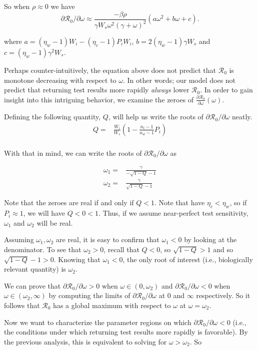 \documentclass[12pt]{article}
\newcommand{\Rnum}{\mathcal{R}_0}
\theoremstyle{definition} %
\begin{document}
So when $\rho \approx 0$ we have $$\partial{\Rnum}/\partial{\omega} \approx  \frac{-\beta \rho}{\gamma W_s\omega^2 (\gamma+\omega)^2}  (a \omega^2 + b \omega + c).$$

where $a=(\eta_w-1)W_i-(\eta_c-1)P_iW_i$, $b=2(\eta_w-1)\gamma W_s$ and $c=(\eta_w-1)\gamma^2 W_s$. 

Perhaps counter-intuitively, the equation above does not predict that $\Rnum$ is monotone decreasing with respect to $\omega$. In other words; our model does not predict that returning test results more rapidly \textit{always} lower $\Rnum$. In order to gain insight into this intriguing behavior, we examine the zeroes of $\frac{\partial{\Rnum}}{\partial{\omega}}(\omega)$.

Defining the following quantity, $Q$, will help us write the roots of $\partial{\Rnum}/\partial{\omega}$ neatly. 
\begin{align}\label{eq:defQ}
    Q =& \frac{W_i}{W_s}\left(1-\frac{n_{t}-1}{n_{w}-1}P_{i}\right) \\
\end{align}

With that in mind, we can write the roots of $\partial{\Rnum}/\partial{\omega}$ as

\begin{align}
    \omega_1 =& \frac{\gamma}{-\sqrt{1-Q}-1} \\
    \omega_2 =& \frac{\gamma}{\sqrt{1-Q}-1}
\end{align}

Note that the zeroes are real if and only if $Q < 1$. Note that have $\eta_c < \eta_w$, so if $P_i \approx 1$, we will have $Q < 0 < 1$. Thus, if we assume near-perfect test sensitivity, $\omega_1$ and $\omega_2$ will be real. 

Assuming $\omega_1, \omega_2$ are real, it is easy to confirm that $\omega_1 < 0$ by looking at the denominator. To see that $\omega_2 > 0$, recall that $Q < 0$, so $\sqrt{1-Q} > 1$ and so $\sqrt{1-Q} -1 > 0$. Knowing that $\omega_1 < 0$, the only root of interest (i.e., biologically relevant quantity) is $\omega_2$. 

We can prove that $\partial{\Rnum}/\partial{\omega} > 0$ when $\omega \in (0,\omega_2)$ and $\partial{\Rnum}/\partial{\omega} < 0$ when $\omega \in (\omega_2,\infty)$ by computing the limits of $\partial{\Rnum}/\partial{\omega}$ at $0$ and $\infty$ respectively. So it follows that $\Rnum$ has a global maximum with respect to $\omega$ at $\omega = \omega_2$.

Now we want to characterize the parameter regions on which $\partial{\Rnum}/\partial{\omega} < 0$ (i.e., the conditions under which returning test results more rapidly is favorable). By the previous analysis, this is equivalent to solving for $\omega > \omega_2$. So
\end{document}
